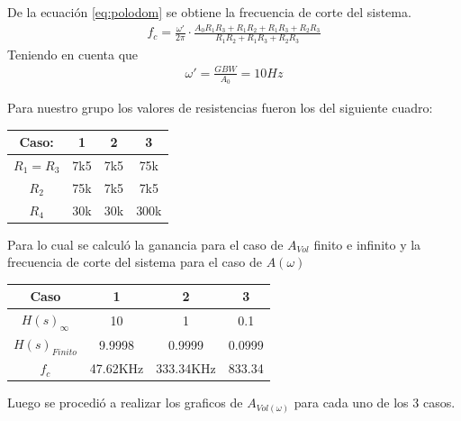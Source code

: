 De la ecuación \ref{eq:polodom} se obtiene la frecuencia de corte del sistema.
\begin{align}
f_c=\frac{\omega'}{2\pi} \cdot \frac{A_0R_1R_3+R_1R_2+R_1R_3+R_2R_3}{R_1R_2+R_1R_3+R_2R_3}
\end{align}
Teniendo en cuenta que
\begin{align}
\omega'=\frac{GBW}{A_0} = 10Hz
\end{align}

Para nuestro grupo los valores de resistencias fueron los del siguiente cuadro:
\begin{table}[H]
\begin{center}
\begin{tabular}{|c|c|c|c|}
\hline
\textbf{Caso:}              & \textbf{1}               & \textbf{2}               & \textbf{3}                \\ \hline
$R_1=R_3$                   & 7k5                      & 7k5                      & 75k                       \\ \hline
$R_2$                       & 75k                      & 7k5                      & 7k5                       \\ \hline
\multicolumn{1}{|c|}{$R_4$} & \multicolumn{1}{l|}{30k} & \multicolumn{1}{l|}{30k} & \multicolumn{1}{l|}{300k} \\ \hline
\end{tabular}
\end{center}
\end{table}
Para lo cual se calculó la ganancia para el caso de $A_{Vol}$ finito e infinito y la frecuencia de corte del sistema para el caso de $A(\omega)$
\begin{table}[H]
\begin{center}
\begin{tabular}{|c|c|c|c|}
\hline
\textbf{Caso}            & \textbf{1} & \textbf{2} & \textbf{3} \\ \hline
\textbf{$H(s)_{\infty}$} & 10         & 1          & 0.1        \\ \hline
\textbf{$H(s)_{Finito}$} & 9.9998     & 0.9999     & 0.0999     \\ \hline
\textbf{$f_c$}           & 47.62KHz   & 333.34KHz  & 833.34     \\ \hline
\end{tabular}
\end{center}
\end{table}
Luego se procedió a realizar los graficos de $A_{Vol(\omega)}$ para cada uno de los 3 casos.
